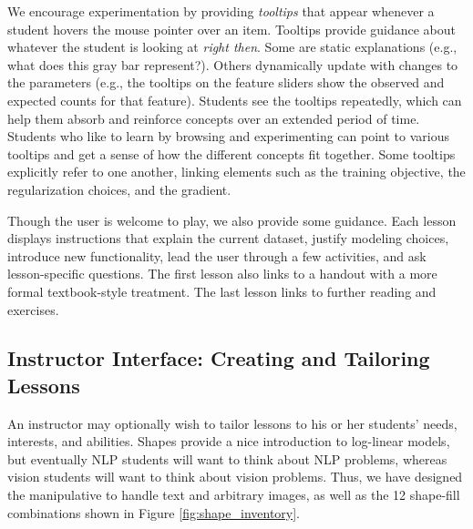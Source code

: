 \documentclass[11pt,letterpaper]{article}
\begin{document}

We encourage experimentation by providing \textit{tooltips} that
appear whenever a student hovers the mouse pointer over an item.
Tooltips provide guidance about whatever the student is looking at
\textit{right then}.  Some are static explanations (e.g., what does
this gray bar represent?).  Others dynamically update with changes to
the parameters (e.g., the tooltips on the feature sliders show the
observed and expected counts for that feature).  Students see the
tooltips repeatedly, which can help them absorb and reinforce concepts
over an extended period of time.  Students who like to learn by
browsing and experimenting can point to various tooltips and get a
sense of how the different concepts fit together.  Some tooltips
explicitly refer to one another, linking elements such as the
training objective, the regularization choices, and the gradient.


Though the user is welcome to play, we also provide some guidance.
Each lesson displays instructions that explain the current dataset,
justify modeling choices, introduce new functionality, lead the user
through a few activities, and ask lesson-specific questions.  The
first lesson also links to a handout with a more formal textbook-style
treatment.  The last lesson links to further reading and exercises.



\subsection{Instructor Interface: Creating and Tailoring Lessons}\label{sec:tailoring}

An instructor may optionally wish to tailor lessons to his or her
students' needs, interests, and abilities.  Shapes provide a nice
introduction to log-linear models, but eventually NLP students will
want to think about NLP problems, whereas vision students will want to
think about vision problems.  Thus, we have designed the manipulative
to handle text and arbitrary images, as well as the 12 shape-fill
combinations shown in Figure \ref{fig:shape_inventory}.
\end{document}

